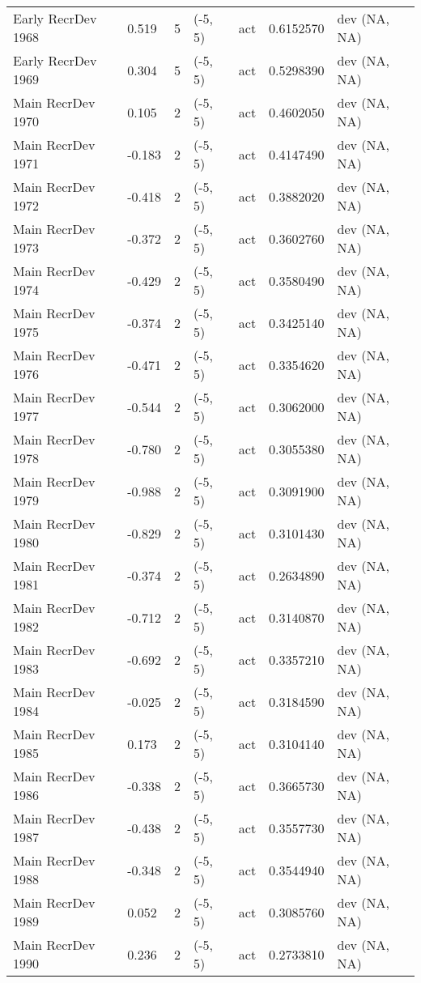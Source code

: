 \documentclass[11pt,
  english,
  letterpaper,
]{article}
\begin{document}
\begin{landscape}
\begin{longtable}[t]{>{\raggedright\arraybackslash}p{7cm}lllll>{\raggedright\arraybackslash}p{4cm}}
Early RecrDev 1968 & 0.519 & 5 & (-5, 5) & act & 0.6152570 & dev (NA, NA)\\
Early RecrDev 1969 & 0.304 & 5 & (-5, 5) & act & 0.5298390 & dev (NA, NA)\\
Main RecrDev 1970 & 0.105 & 2 & (-5, 5) & act & 0.4602050 & dev (NA, NA)\\
Main RecrDev 1971 & -0.183 & 2 & (-5, 5) & act & 0.4147490 & dev (NA, NA)\\
Main RecrDev 1972 & -0.418 & 2 & (-5, 5) & act & 0.3882020 & dev (NA, NA)\\
Main RecrDev 1973 & -0.372 & 2 & (-5, 5) & act & 0.3602760 & dev (NA, NA)\\
Main RecrDev 1974 & -0.429 & 2 & (-5, 5) & act & 0.3580490 & dev (NA, NA)\\
Main RecrDev 1975 & -0.374 & 2 & (-5, 5) & act & 0.3425140 & dev (NA, NA)\\
Main RecrDev 1976 & -0.471 & 2 & (-5, 5) & act & 0.3354620 & dev (NA, NA)\\
Main RecrDev 1977 & -0.544 & 2 & (-5, 5) & act & 0.3062000 & dev (NA, NA)\\
Main RecrDev 1978 & -0.780 & 2 & (-5, 5) & act & 0.3055380 & dev (NA, NA)\\
Main RecrDev 1979 & -0.988 & 2 & (-5, 5) & act & 0.3091900 & dev (NA, NA)\\
Main RecrDev 1980 & -0.829 & 2 & (-5, 5) & act & 0.3101430 & dev (NA, NA)\\
Main RecrDev 1981 & -0.374 & 2 & (-5, 5) & act & 0.2634890 & dev (NA, NA)\\
Main RecrDev 1982 & -0.712 & 2 & (-5, 5) & act & 0.3140870 & dev (NA, NA)\\
Main RecrDev 1983 & -0.692 & 2 & (-5, 5) & act & 0.3357210 & dev (NA, NA)\\
Main RecrDev 1984 & -0.025 & 2 & (-5, 5) & act & 0.3184590 & dev (NA, NA)\\
Main RecrDev 1985 & 0.173 & 2 & (-5, 5) & act & 0.3104140 & dev (NA, NA)\\
Main RecrDev 1986 & -0.338 & 2 & (-5, 5) & act & 0.3665730 & dev (NA, NA)\\
Main RecrDev 1987 & -0.438 & 2 & (-5, 5) & act & 0.3557730 & dev (NA, NA)\\
Main RecrDev 1988 & -0.348 & 2 & (-5, 5) & act & 0.3544940 & dev (NA, NA)\\
Main RecrDev 1989 & 0.052 & 2 & (-5, 5) & act & 0.3085760 & dev (NA, NA)\\
Main RecrDev 1990 & 0.236 & 2 & (-5, 5) & act & 0.2733810 & dev (NA, NA)\\

\end{longtable}
\end{landscape}
\end{document}
